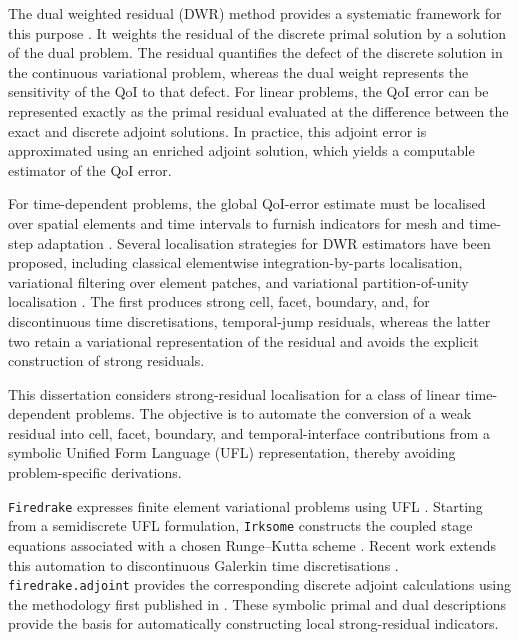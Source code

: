 The dual weighted residual (DWR) method provides a systematic framework for this purpose \cite{Becker_Rannacher_1996,Becker_Rannacher_2001}. It weights the residual of the discrete primal solution by a solution of the dual problem. The residual quantifies the defect of the discrete solution in the continuous variational problem, whereas the dual weight represents the sensitivity of the QoI to that defect.
For linear problems, the QoI error can be represented exactly as the primal residual evaluated at the difference between the exact and discrete adjoint solutions. In practice, this adjoint error is approximated using an enriched adjoint solution, which yields a computable estimator of the QoI error.

For time-dependent problems, the global QoI-error estimate must be localised over spatial elements and time intervals to furnish indicators for mesh and time-step adaptation \cite{Becker_Rannacher_2001,Schmich_Vexler_2008}. 
Several localisation strategies for DWR estimators have been proposed, including classical elementwise integration-by-parts localisation, variational filtering over element patches, and variational partition-of-unity localisation \cite{ThieleWick2024,RichterWick2015}. The first produces strong cell, facet, boundary, and, for discontinuous time discretisations, temporal-jump residuals, whereas the latter two retain a variational representation of the residual and avoids the explicit construction of strong residuals.

This dissertation considers strong-residual localisation for a class of linear time-dependent problems. The objective is to automate the conversion of a weak residual into cell, facet, boundary, and temporal-interface contributions from a symbolic Unified Form Language (UFL) representation, thereby avoiding problem-specific derivations.

\texttt{Firedrake} expresses finite element variational problems using UFL \cite{Firedrake}. Starting from a semidiscrete UFL formulation, \texttt{Irksome} constructs the coupled stage equations associated with a chosen Runge--Kutta scheme \cite{Farrell_Kirby_Marchena_2021}. Recent work extends this automation to discontinuous Galerkin time discretisations \cite{andrews2026automatedgalerkintimestepping}.
\texttt{firedrake.adjoint} provides the corresponding discrete adjoint calculations using the methodology first published in \cite{Farrell_Ham_Funke_Rognes_2013}.
These symbolic primal and dual descriptions provide the basis for automatically constructing local strong-residual indicators. 




